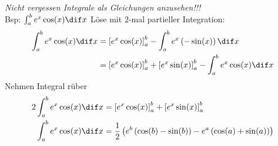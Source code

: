 \begin{example}[breakable]
    \emph{Nicht vergessen Integrale als Gleichungen anzusehen!!!}\\
    Bsp: $\int_a^b e^x \cos(x) \dif x$
    \tcblower
    Löse mit $2$-mal partieller Integration:
    \begin{align*}
        \int_a^b e^x \cos(x) \dif x &= \left[e^x \cos(x)\right]_a^b - \int_a^b e^x \left(-\sin(x)\right) \dif x\\
        &= \left[e^x \cos(x)\right]_a^b + \left[e^x \sin(x)\right]_a^b - \int_a^b e^x \cos(x) \dif x
    \end{align*}
    Nehmen Integral rüber
    \begin{align*}
        2 \int_a^b e^x \cos(x) \dif x &= \left[e^x \cos(x)\right]_a^b + \left[e^x \sin(x)\right]_a^b\\
        \int_a^b e^x \cos(x) \dif x &= \frac{1}{2} \left(e^b\left(\cos(b) - \sin(b)\right) - e^a\left(\cos(a) + \sin(a)\right)\right)
    \end{align*}
\end{example}